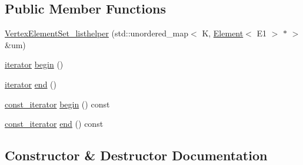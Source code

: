 \subsection*{Public Member Functions}
\begin{DoxyCompactItemize}
\item 
\mbox{\hyperlink{classbridges_1_1datastructure_1_1_graph_adj_list_1_1_vertex_element_set__listhelper_a498a884dd8d896433c057cf45208f73b}{Vertex\+Element\+Set\+\_\+listhelper}} (std\+::unordered\+\_\+map$<$ K, \mbox{\hyperlink{classbridges_1_1datastructure_1_1_element}{Element}}$<$ E1 $>$ $\ast$ $>$ \&um)
\item 
\mbox{\hyperlink{classbridges_1_1datastructure_1_1_graph_adj_list_1_1_vertex_element_set__listhelper_1_1iterator}{iterator}} \mbox{\hyperlink{classbridges_1_1datastructure_1_1_graph_adj_list_1_1_vertex_element_set__listhelper_a7903e33821742f555cc3e4465a6c81aa}{begin}} ()
\item 
\mbox{\hyperlink{classbridges_1_1datastructure_1_1_graph_adj_list_1_1_vertex_element_set__listhelper_1_1iterator}{iterator}} \mbox{\hyperlink{classbridges_1_1datastructure_1_1_graph_adj_list_1_1_vertex_element_set__listhelper_a437c23955211e60351a6fcb8dcff65a6}{end}} ()
\item 
\mbox{\hyperlink{classbridges_1_1datastructure_1_1_graph_adj_list_1_1_vertex_element_set__listhelper_1_1const__iterator}{const\+\_\+iterator}} \mbox{\hyperlink{classbridges_1_1datastructure_1_1_graph_adj_list_1_1_vertex_element_set__listhelper_ac0a45cd4acc2aeefaedd10ee9e954927}{begin}} () const
\item 
\mbox{\hyperlink{classbridges_1_1datastructure_1_1_graph_adj_list_1_1_vertex_element_set__listhelper_1_1const__iterator}{const\+\_\+iterator}} \mbox{\hyperlink{classbridges_1_1datastructure_1_1_graph_adj_list_1_1_vertex_element_set__listhelper_ade98a69d94c58ec30a24f0ed802fe672}{end}} () const
\end{DoxyCompactItemize}


\subsection{Constructor \& Destructor Documentation}
\mbox{\label{classbridges_1_1datastructure_1_1_graph_adj_list_1_1_vertex_element_set__listhelper_a498a884dd8d896433c057cf45208f73b}} 

